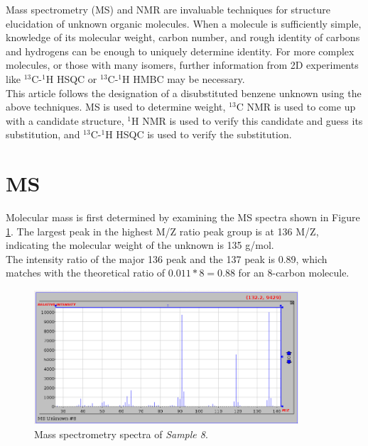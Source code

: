 \documentclass[8.5pt,twoside,twocolumn]{article}
\begin{document}

Mass spectrometry (MS) and NMR are invaluable techniques for structure elucidation of unknown organic molecules. When a molecule is sufficiently simple, knowledge of its molecular weight, carbon number, and rough identity of carbons and hydrogens can be enough to uniquely determine identity. For more complex molecules, or those with many isomers, further information from 2D experiments like $^{13}$C-$^{1}$H HSQC or $^{13}$C-$^{1}$H HMBC may be necessary.\\

This article follows the designation of a disubstituted benzene unknown using the above techniques. MS is used to determine weight, $^{13}$C NMR is used to come up with a candidate structure, $^{1}$H NMR is used to verify this candidate and guess its substitution, and $^{13}$C-$^{1}$H HSQC is used to verify the substitution.\\

\section{MS}
Molecular mass is first determined by examining the MS spectra shown in Figure \ref{fig:MS}. The largest peak in the highest M/Z ratio peak group is at 136 M/Z, indicating the molecular weight of the unknown is 135 g/mol.\\

The intensity ratio of the major 136 peak and the 137 peak is 0.89, which matches with the theoretical ratio of $0.011*8 = 0.88$ for an 8-carbon molecule.\\

\begin{figure}[h]
\centering
  \includegraphics[height=5cm]{figures/MS.png}
  \caption{Mass spectrometry spectra of \textit{Sample 8}.}
  \label{fig:MS}
\end{figure}
\end{document}
